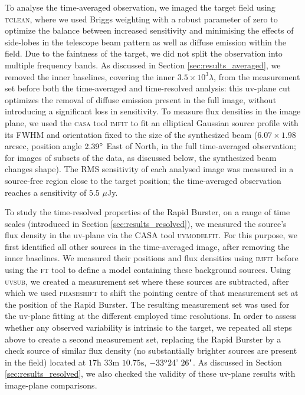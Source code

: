 \documentclass[fleqn,usenatbib]{mnras}
\begin{document}
To analyse the time-averaged observation, we imaged the target field using \textsc{tclean}, where we used Briggs weighting with a robust parameter of zero to optimize the balance between increased sensitivity and minimising the effects of side-lobes in the telescope beam pattern as well as diffuse emission within the field. Due to the faintness of the target, we did not split the observation into multiple frequency bands. As discussed in Section \ref{sec:results_averaged}, we removed the inner baselines, covering the inner $3.5\times10^3\lambda$, from the measurement set before both the time-averaged and time-resolved analysis: this uv-plane cut optimizes the removal of diffuse emission present in the full image, without introducing a significant loss in sensitivity. To measure flux densities in the image plane, we used the \textsc{casa} tool \textsc{imfit} to fit an elliptical Gaussian source profile with its FWHM and orientation fixed to the size of the synthesized beam ($6.07\times1.98$ arcsec, position angle $2.39\degree$ East of North, in the full time-averaged observation; for images of subsets of the data, as discussed below, the synthesized beam changes shape).  The RMS sensitivity of each analysed image was measured in a source-free region close to the target position; the time-averaged observation reaches a sensitivity of $5.5$ $\mu$Jy.

To study the time-resolved properties of the Rapid Burster, on a range of time scales (introduced in Section \ref{sec:results_resolved}), we measured the source's flux density in the uv-plane via the \textsc{CASA} tool \textsc{uvmodelfit}. For this purpose, we first identified all other sources in the time-averaged image, after removing the inner baselines. We measured their positions and flux densities using \textsc{imfit} before using the \textsc{ft} tool to define a model containing these background sources. Using \textsc{uvsub}, we created a measurement set where these sources are subtracted, after which we used \textsc{phaseshift} to shift the pointing centre of that measurement set at the position of the Rapid Burster. The resulting measurement set was used for the uv-plane fitting at the different employed time resolutions. In order to assess whether any observed variability is intrinsic to the target, we repeated all steps above to create a second measurement set, replacing the Rapid Burster by a check source of similar flux density (no substantially brighter sources are present in the field) located at $17\text{h } 33\text{m } 10.75\text{s}$, $-33^{\rm o} 24\text{' } 26\text{"}$. As discussed in Section \ref{sec:results_resolved}, we also checked the validity of these uv-plane results with image-plane comparisons.
\end{document}
